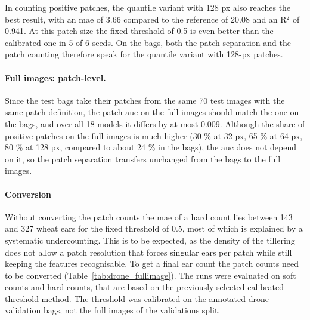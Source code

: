 \documentclass[12pt,parskip = half, DIV=classic,listof=totoc]{scrartcl}
\begin{document}
		In counting positive patches, the quantile variant with 128 px also reaches the best result, 
		with an \ac{mae} of 3.66 compared to the reference of 20.08 and an R$^2$ of 0.941. At this patch size the fixed threshold of 0.5 
		is even better than the calibrated one in 5 of 6 seeds. On the bags, both the patch separation and the patch 
		counting therefore speak for the quantile variant with 128-px patches.

		\paragraph{Full images: patch-level.}

		Since the test bags take their patches from the same 70 test images with the same patch definition, the patch \ac{auc} on the full 
		images should match the one on the bags, and over all 18 models it differs by at most 0.009. 
		Although the share of positive patches on the full images is much higher (30 \% at 32 px, 65 \% at 64 px, 80 \% at 128 px, 
		compared to about 24 \% in the bags), the \ac{auc} does not depend on it, so the patch separation 
		transfers unchanged from the bags to the full images.

		\paragraph{Conversion}
		Without converting the patch counts the \ac{mae} of a hard count lies between 143 and 327 wheat ears for the fixed threshold of 0.5, most of which is 
		explained by a systematic undercounting. This is to be expected, as the density of the tillering does not allow a 
		patch resolution that forces singular ears per patch while still keeping the features recognisable. 
		To get a final ear count the patch counts need to be converted (Table~\ref{tab:drone_fullimage}). The runs 
		were evaluated on soft counts and hard counts, that are based on the previously selected calibrated threshold method. 
		The threshold was calibrated on the annotated drone validation bags, not the full images of the validations split.
\end{document}
